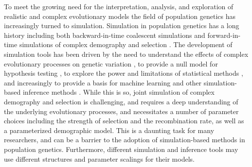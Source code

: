 \documentclass[hidelinks]{article}
\begin{document}
    To meet the growing need for the interpretation,
    analysis, and exploration of realistic and complex evolutionary models
    the field of population genetics has increasingly turned to simulation.
    Simulation in population genetics has a long history 
    including both backward-in-time coalescent simulations
    \citep{kingman1982genealogy,hudson1983testing, hudson1990gene}
    and forward-in-time simulations of complex demography and selection
    \citep[e.g.,][]{gillespie1984molecular,thornton2014c++, haller2019slim}.
    The development of simulation tools has been driven by the need to
    understand the effects of complex evolutionary processes on genetic
    variation \citep[e.g.,][]{galloway2020few}, to provide a null model for hypothesis testing
    \citep[e.g.,][]{hudson1992statistical,hudson1994evidence,sabeti2002detecting},
    to explore the power and limitations of statistical methods \citep[e.g.,][]{przeworski2002signature},
    and increasingly to provide a basis for machine learning and other
    simulation-based inference methods \citep[e.g.,][]{beaumont2002approximate,pavlidis2010searching,lin2011distinguishing,kern2018diplos,mughal2019localizing,sanchez2021deep,wang2021automatic}.
    While this is so, joint simulation of complex demography and selection
    is challenging, and requires a deep understanding of the underlying
    evolutionary processes, and necessitates a number of parameter choices including
    the strength of selection and the
    recombination rate, as well as a parameterized demographic model.
    This is a daunting task for many researchers, and can be a barrier to
    the adoption of simulation-based methods in population genetics.
    Furthermore, different simulation and inference tools may use different structures
    and parameter scalings for their models.
\end{document}
